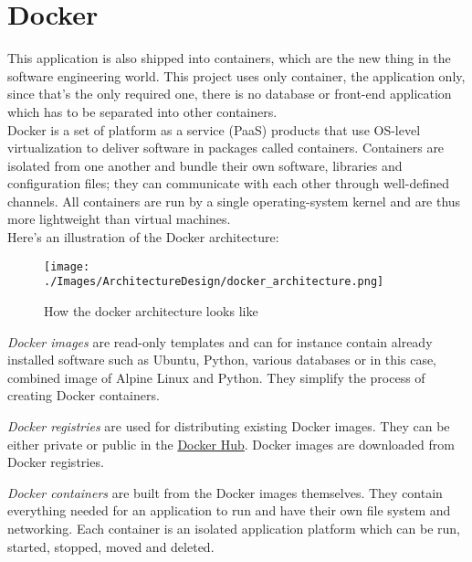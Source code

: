 \section{Docker}
This application is also shipped into containers, which are the new thing in the software engineering world. This project uses only container, the application only, since that's the only required one, there is no database or front-end application which has to be separated into other containers.\\
Docker is a set of platform as a service (PaaS) products that use OS-level virtualization to deliver software in packages called containers. Containers are isolated from one another and bundle their own software, libraries and configuration files; they can communicate with each other through well-defined channels. All containers are run by a single operating-system kernel and are thus more lightweight than virtual machines. \cite{WhatIsDocker}\\
\newline
Here's an illustration of the Docker architecture:

\begin{figure}[H]
	\texttt{[image: ./Images/ArchitectureDesign/docker\_architecture.png]}
	\caption{How the docker architecture looks like \cite{DockerOverview}}
\end{figure}
\textit{Docker images} are read-only templates and can for instance contain already installed software such as Ubuntu, Python, various databases or in this case, combined image of Alpine Linux and Python. They simplify the process of creating Docker containers.

\textit{Docker registries} are used for distributing existing Docker images. They can be either private or public in the \href{https://hub.docker.com/}{Docker Hub}. Docker images are downloaded from Docker registries.

\textit{Docker containers} are built from the Docker images themselves. They contain everything needed for an application to run and have their own file system and networking. Each container is an isolated application platform which can be run, started, stopped, moved and deleted.

